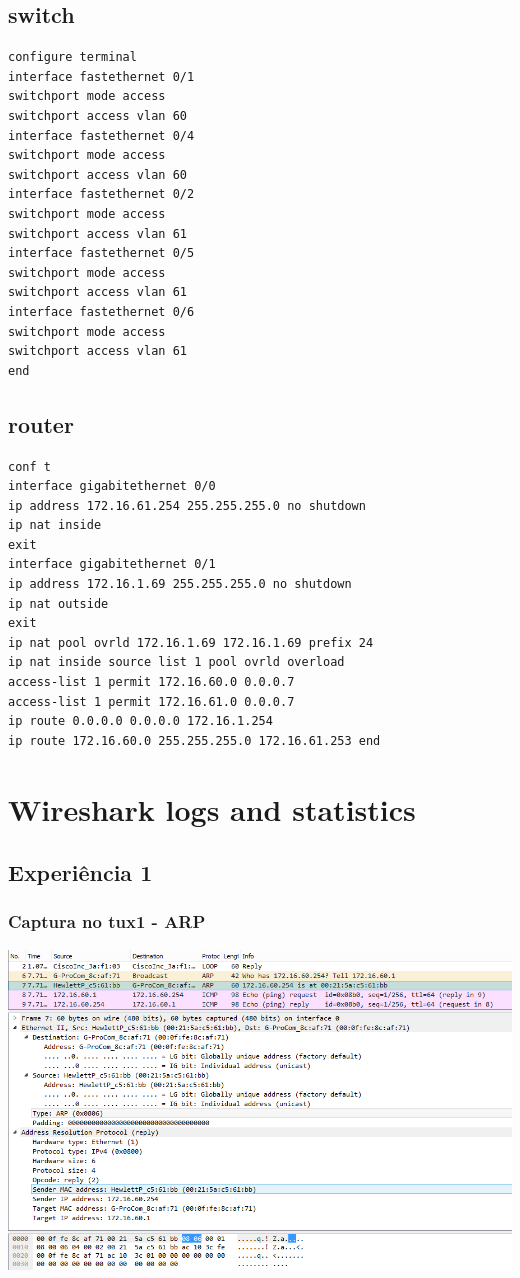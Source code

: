 \documentclass[11pt,a4paper,reqno]{report}
\numberwithin{equation}{section}
\begin{document}
\begin{appendices}
\section{switch}
\begin{verbatim}
configure terminal
interface fastethernet 0/1
switchport mode access
switchport access vlan 60
interface fastethernet 0/4
switchport mode access
switchport access vlan 60
interface fastethernet 0/2
switchport mode access
switchport access vlan 61
interface fastethernet 0/5
switchport mode access
switchport access vlan 61
interface fastethernet 0/6
switchport mode access
switchport access vlan 61
end
\end{verbatim}
\section{router}
\begin{verbatim}
conf t
interface gigabitethernet 0/0
ip address 172.16.61.254 255.255.255.0 no shutdown
ip nat inside
exit
interface gigabitethernet 0/1
ip address 172.16.1.69 255.255.255.0 no shutdown
ip nat outside
exit
ip nat pool ovrld 172.16.1.69 172.16.1.69 prefix 24 
ip nat inside source list 1 pool ovrld overload
access-list 1 permit 172.16.60.0 0.0.0.7 
access-list 1 permit 172.16.61.0 0.0.0.7
ip route 0.0.0.0 0.0.0.0 172.16.1.254
ip route 172.16.60.0 255.255.255.0 172.16.61.253 end
\end{verbatim}

\chapter{Wireshark logs and statistics}%

\section{Experiência 1}%
\label{ex1_headers}
\subsection{Captura no tux1 - ARP}
\includegraphics[width=16cm]{ex1_arp.png}

\end{appendices}
\end{document}
